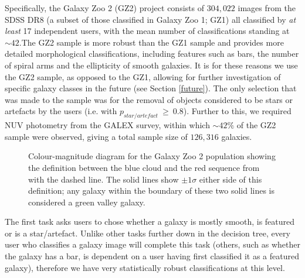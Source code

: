 \documentclass[useAMS,usenatbib]{mn2e}
\begin{document}
Specifically, the Galaxy Zoo 2 (GZ2) project consists of $304, 022$ images from the SDSS DR8 (a subset of those classified in Galaxy Zoo 1; GZ1) all classified by \emph{at least} 17 independent users, with the mean number of classifications standing at $\sim42$.The GZ2 sample is more robust than the GZ1 sample and provides more detailed morphological classifications, including features such as bars, the number of spiral arms and the ellipticity of smooth galaxies. It is for these reasons we use the GZ2 sample, as opposed to the GZ1, allowing for further investigation of specific galaxy classes in the future (see Section \ref{future}). The only selection that was made to the sample was for the removal of  objects considered to be stars or artefacts by the users (i.e. with $p_{star/artefact} ~\geq~ 0.8$). Further to this, we required NUV photometry from the GALEX survey, within which $\sim42\%$ of the GZ2 sample were observed, giving a total sample size of $126, 316$ galaxies. 

\begin{figure}
\caption{Colour-magnitude diagram for the Galaxy Zoo 2 population showing the definition between the blue cloud and the red sequence from \citet{Baldry04} with the dashed line. The solid lines show $\pm 1\sigma$ either side of this definition; any galaxy within the boundary of these two solid lines is considered a green valley galaxy.}
\label{CMGV}
\end{figure}

The first task asks users to chose whether a galaxy is mostly smooth, is featured or is a star/artefact. Unlike other tasks further down in the decision tree, every user who classifies a galaxy image will complete this task (others, such as whether the galaxy has a bar, is dependent on a user having first classified it as a featured galaxy), therefore we have very statistically robust classifications at this level.
\end{document}
